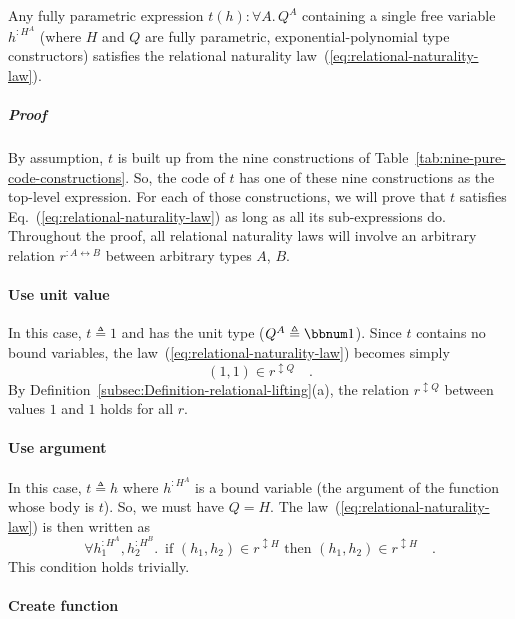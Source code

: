 Any fully parametric expression $t(h):\forall A.\,Q^{A}$ containing
a single free variable $h^{:H^{A}}$ (where $H$ and $Q$ are fully
parametric, exponential-polynomial type constructors) satisfies the
relational naturality law~(\ref{eq:relational-naturality-law}).

\subparagraph{Proof }

By assumption, $t$ is built up from the nine constructions of Table~\ref{tab:nine-pure-code-constructions}.
So, the code of $t$ has one of these nine constructions as the top-level
expression. For each of those constructions, we will prove that $t$
satisfies Eq.~(\ref{eq:relational-naturality-law}) as long as all
its sub-expressions do. Throughout the proof, all relational naturality
laws will involve an arbitrary relation $r^{:A\leftrightarrow B}$
between arbitrary types $A$, $B$.

\paragraph{Use unit value}

In this case, $t\triangleq1$ and has the unit type ($Q^{A}\triangleq\bbnum 1$).
Since $t$ contains no bound variables, the law~(\ref{eq:relational-naturality-law})
becomes simply
\[
(1,1)\in r^{\updownarrow Q}\quad.
\]
By Definition~\ref{subsec:Definition-relational-lifting}(a), the
relation $r^{\updownarrow Q}$ between values $1$ and $1$ holds
for all $r$.

\paragraph{Use argument}

In this case, $t\triangleq h$ where $h^{:H^{A}}$ is a bound variable
(the argument of the function whose body is $t$). So, we must have
$Q=H$. The law~(\ref{eq:relational-naturality-law}) is then written
as
\[
\forall h_{1}^{:H^{A}},h_{2}^{:H^{B}}.\,\text{ if }(h_{1},h_{2})\in r^{\updownarrow H}\text{ then }(h_{1},h_{2})\in r^{\updownarrow H}\quad.
\]
This condition holds trivially.

\paragraph{Create function}

